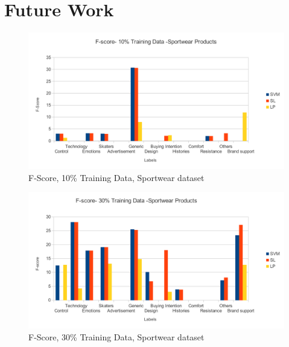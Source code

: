 \documentclass[4pt,a4paper,twocolumn]{article}
\begin{document}
\section{Future Work}

{}






\begin{figure}[]
  
  \centering
    \includegraphics[scale=0.7]{graphics/sportWear/fscore-10-nike}
    \caption{F-Score, 10\% Training Data, Sportwear dataset}
   \label{fig:nike_10_fscore}  
\end{figure}

\begin{figure}[]
  
  \centering
    \includegraphics[scale=0.7]{graphics/sportWear/fscore-30-nike}
    \caption{F-Score, 30\% Training Data, Sportwear dataset}
   \label{fig:nike_30_fscore}  
\end{figure}
\end{document}
